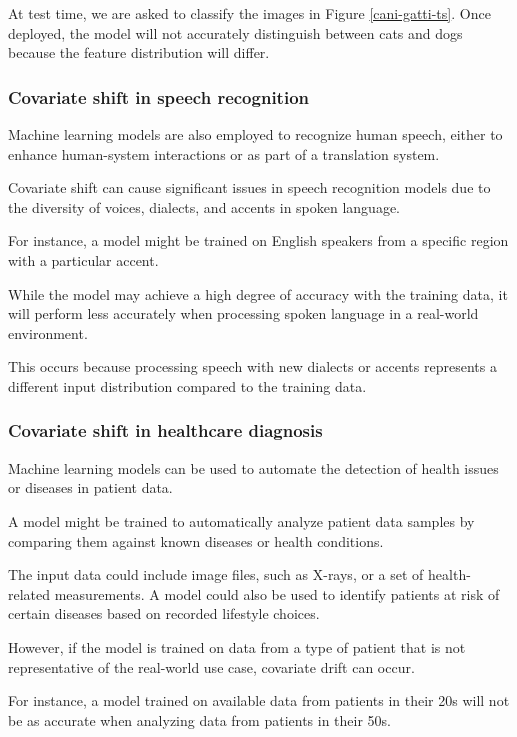 At test time, we are asked to classify the images in Figure \cref{cani-gatti-ts}. Once deployed, the model will not accurately distinguish between cats and dogs because the feature distribution will differ.


\subsubsection{Covariate shift in speech recognition}

Machine learning models are also employed to recognize human speech, either to enhance human-system interactions or as part of a translation system.

Covariate shift can cause significant issues in speech recognition models due to the diversity of voices, dialects, and accents in spoken language. 

For instance, a model might be trained on English speakers from a specific region with a particular accent.

While the model may achieve a high degree of accuracy with the training data, it will perform less accurately when processing spoken language in a real-world environment. 

This occurs because processing speech with new dialects or accents represents a different input distribution compared to the training data.


\subsubsection{Covariate shift in healthcare diagnosis}

Machine learning models can be used to automate the detection of health issues or diseases in patient data.

A model might be trained to automatically analyze patient data samples by comparing them against known diseases or health conditions.

The input data could include image files, such as X-rays, or a set of health-related measurements. A model could also be used to identify patients at risk of certain diseases based on recorded lifestyle choices.

However, if the model is trained on data from a type of patient that is not representative of the real-world use case, covariate drift can occur.

For instance, a model trained on available data from patients in their 20s will not be as accurate when analyzing data from patients in their 50s.

